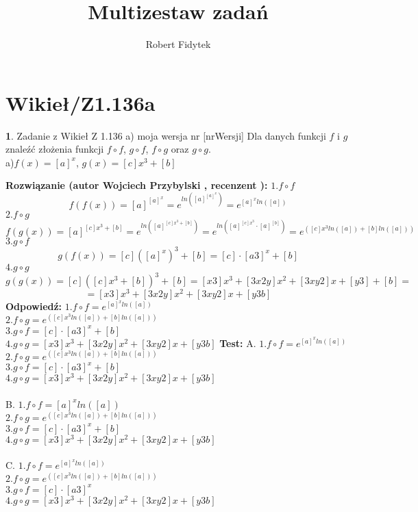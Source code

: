 \documentclass[12pt, a4paper]{article}
\title{Multizestaw zadań}
\author{Robert Fidytek}
\date{}
\theoremstyle{definition} %
\newtheorem{zad}{}
\newcommand{\kategoria}[1]{\section{#1}} %
\newcommand{\zadStart}[1]{\begin{zad}#1\newline} %
\newcommand{\zadStop}{\end{zad}}   %
\newcommand{\rozwStart}[2]{\noindent \textbf{Rozwiązanie (autor #1 , recenzent #2): }\newline} %
\newcommand{\rozwStop}{\newline}                                            %
\newcommand{\odpStart}{\noindent \textbf{Odpowiedź:}\newline}    %
\newcommand{\odpStop}{\newline}                                             %
\newcommand{\testStart}{\noindent \textbf{Test:}\newline} %
\begin{document}
\maketitle


\kategoria{Wikieł/Z1.136a}
\zadStart{Zadanie z Wikieł Z 1.136 a) moja wersja nr [nrWersji]}
Dla danych funkcji $f$ i $g$ znaleźć złożenia funkcji $f \circ f$, $g \circ f$, $f \circ g$ oraz $g \circ g$.\\
a)$f(x)=[a]^{x}$, $g(x)=[c]x^{3}+[b]$
\zadStop
\rozwStart{Wojciech Przybylski}{}
$1. f \circ f$
$$f(f(x))=[a]^{[a]^{x}}=e^{ln([a]^{[a]^{x}})}=e^{[a]^{x}ln([a])}$$
$2. f \circ g$
$$f(g(x))=[a]^{[c]x^{3}+[b]}=e^{ln([a]^{[c]x^{3}+[b]})}=e^{ln([a]^{[c]x^{3}}\cdot[a]^{[b]})}=e^{([c]x^{3}ln([a])+[b]ln([a]))}$$
$3. g \circ f$
$$g(f(x))=[c]([a]^{x})^{3}+[b]=[c]\cdot[a3]^{x}+[b]$$
$4. g \circ g$
$$g(g(x))=[c]([c]x^{3}+[b])^{3}+[b]=[x3]x^{3}+[3x2y]x^{2}+[3xy2]x+[y3]+[b]=$$
$$=[x3]x^{3}+[3x2y]x^{2}+[3xy2]x+[y3b]$$
\rozwStop
\odpStart
$1. f \circ f = e^{[a]^{x}ln([a])}$\\
$2. f \circ g = e^{([c]x^{3}ln([a])+[b]ln([a]))}$\\
$3. g \circ f = [c]\cdot[a3]^{x}+[b]$\\
$4. g \circ g =[x3]x^{3}+[3x2y]x^{2}+[3xy2]x+[y3b] $
\odpStop
\testStart
A. $1. f \circ f = e^{[a]^{x}ln([a])}$\\
$2. f \circ g = e^{([c]x^{3}ln([a])+[b]ln([a]))}$\\
$3. g \circ f = [c]\cdot[a3]^{x}+[b]$\\
$4. g \circ g =[x3]x^{3}+[3x2y]x^{2}+[3xy2]x+[y3b] $\\
\\
B. $1. f \circ f = [a]^{x}ln([a])$\\
$2. f \circ g = e^{([c]x^{3}ln([a])+[b]ln([a]))}$\\
$3. g \circ f = [c]\cdot[a3]^{x}+[b]$\\
$4. g \circ g =[x3]x^{3}+[3x2y]x^{2}+[3xy2]x+[y3b] $\\
\\
C. $1. f \circ f = e^{[a]^{x}ln([a])}$\\
$2. f \circ g = e^{([c]x^{3}ln([a])+[b]ln([a]))}$\\
$3. g \circ f = [c]\cdot[a3]^{x}$\\
$4. g \circ g =[x3]x^{3}+[3x2y]x^{2}+[3xy2]x+[y3b] $\\
\end{document}
